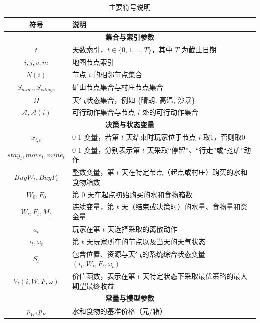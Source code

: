 \documentclass[UTF8,a4paper,12pt]{ctexart}
\begin{document}
\begin{table}[H]
    \centering
    \caption{主要符号说明}
    \label{tab:symbols}
    \renewcommand{\arraystretch}{1.2} %
    \begin{tabular}{cl}
        \toprule
        \textbf{符号} & \textbf{说明} \\
        \midrule
        \multicolumn{2}{c}{\textbf{集合与索引参数}} \\
        \midrule
        $t$ & 天数索引，$t \in \{0, 1, \dots, T\}$，其中 $T$ 为截止日期 \\
        $i, j, v, m$ & 地图节点索引  \\
        $N(i)$ & 节点 $i$ 的相邻节点集合 \\
        $S_{mine}, S_{village}$ & 矿山节点集合与村庄节点集合  \\
        $\Omega$ & 天气状态集合，例如 \{晴朗, 高温, 沙暴\}  \\
        $\mathcal{A}, \mathcal{A}(i)$ & 可行动作集合与节点 $i$ 处的可行动作集合  \\
        \midrule
        \multicolumn{2}{c}{\textbf{决策与状态变量}} \\
        \midrule
        $x_{i,t}$ & 0-1 变量，若第 $t$ 天结束时玩家位于节点 $i$ 取1，否则取0  \\
        $stay_t, move_t, mine_t$ & 0-1 变量，分别表示第 $t$ 天采取“停留”、“行走”或“挖矿”动作  \\
        $BuyW_t, BuyF_t$ & 整数变量，第 $t$ 天在特定节点（起点或村庄）购买的水和食物箱数  \\
        $W_0, F_0$ & 第 0 天在起点初始购买的水和食物箱数  \\
        $W_t, F_t, M_t$ & 连续变量，第 $t$ 天（结束或决策时）的水量、食物量和资金量  \\
        $a_t$ & 玩家在第 $t$ 天选择采取的离散动作  \\
        $i_t, \omega_t$ & 第 $t$ 天玩家所在的节点以及当天的天气状态  \\
        $S_t$ & 包含位置、资源与天气的系统综合状态变量 $(i_t, W_t, F_t, \omega_t)$  \\
        $V_t(i,W,F,\omega)$ & 价值函数，表示在第 $t$ 天特定状态下采取最优策略的最大期望最终收益  \\
        \midrule
        \multicolumn{2}{c}{\textbf{常量与模型参数}} \\
        \midrule
        $p_W, p_F$ & 水和食物的基准价格（元/箱）\\

\end{tabular}
\end{table}
\end{document}
